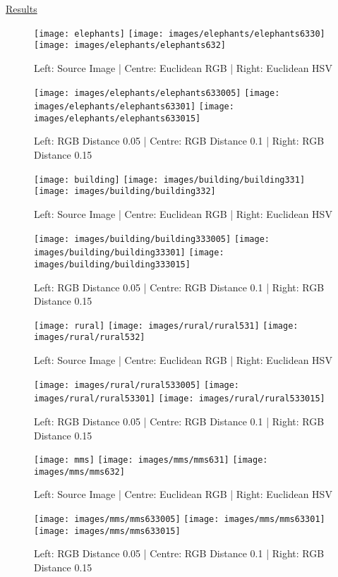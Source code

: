 \documentclass{article}
\begin{document}
\underline{Results}

\begin{figure}[H]
\begin{center}
\texttt{[image: elephants]}
\texttt{[image: images/elephants/elephants6330]}
\texttt{[image: images/elephants/elephants632]}
\caption{Left: Source Image | Centre: Euclidean RGB | Right: Euclidean HSV }
\texttt{[image: images/elephants/elephants633005]}
\texttt{[image: images/elephants/elephants63301]}
\texttt{[image: images/elephants/elephants633015]}
\caption{Left: RGB Distance 0.05 | Centre: RGB Distance 0.1 | Right: RGB Distance 0.15 }
\end{center}
\end{figure}

\begin{figure}[H]
\begin{center}
\texttt{[image: building]}
\texttt{[image: images/building/building331]}
\texttt{[image: images/building/building332]}
\caption{Left: Source Image | Centre: Euclidean RGB | Right: Euclidean HSV }
\texttt{[image: images/building/building333005]}
\texttt{[image: images/building/building33301]}
\texttt{[image: images/building/building333015]}
\caption{Left: RGB Distance 0.05 | Centre: RGB Distance 0.1 | Right: RGB Distance 0.15 }
\end{center}
\end{figure}

\begin{figure}[H]
\begin{center}
\texttt{[image: rural]}
\texttt{[image: images/rural/rural531]}
\texttt{[image: images/rural/rural532]}
\caption{Left: Source Image | Centre: Euclidean RGB | Right: Euclidean HSV }
\texttt{[image: images/rural/rural533005]}
\texttt{[image: images/rural/rural53301]}
\texttt{[image: images/rural/rural533015]}
\caption{Left: RGB Distance 0.05 | Centre: RGB Distance 0.1 | Right: RGB Distance 0.15 }
\end{center}
\end{figure}

\begin{figure}[H]
\begin{center}
\texttt{[image: mms]}
\texttt{[image: images/mms/mms631]}
\texttt{[image: images/mms/mms632]}
\caption{Left: Source Image | Centre: Euclidean RGB | Right: Euclidean HSV }
\texttt{[image: images/mms/mms633005]}
\texttt{[image: images/mms/mms63301]}
\texttt{[image: images/mms/mms633015]}
\caption{Left: RGB Distance 0.05 | Centre: RGB Distance 0.1 | Right: RGB Distance 0.15 }
\end{center}
\end{figure}






\nocite{*}


\end{document}
